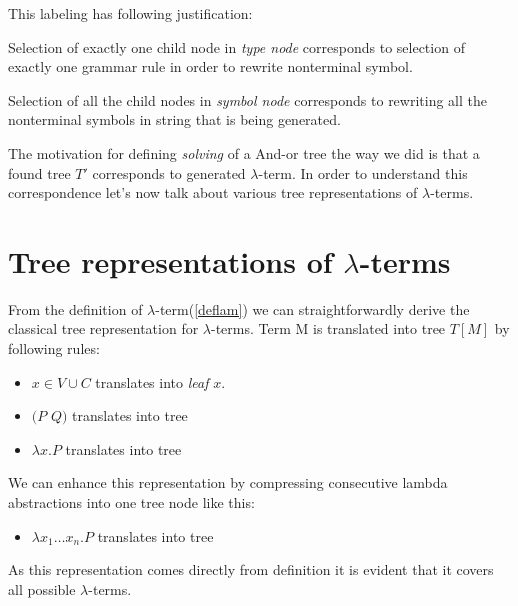 \documentclass[12pt,a4paper]{report}
\newcommand{\lterm}{$\lambda$-term\xspace}
\newcommand{\lterms}{$\lambda$-terms\xspace}
\begin{document}
This labeling has following justification: 

Selection of exactly one
child node in \textit{type node} corresponds to selection of exactly one
grammar rule in order to rewrite nonterminal symbol.  

Selection of all the child nodes in \textit{symbol node} corresponds to 
rewriting all the nonterminal symbols in string that is being generated.  

The motivation for defining \textit{solving} of a And-or tree the way we did is that
a found tree $T'$ corresponds to generated \lterm. 
In order to understand this correspondence let's now talk about various tree representations
of \lterms.

\section{Tree representations of \lterms}
\label{tree-reps}

\newcommand{\sexprTree}{sexpr-tree\xspace}
\newcommand{\atTree}{@-tree\xspace}



From the definition of \lterm (\ref{deflam}) we can straightforwardly derive 
the classical tree representation for \lterms. Term M is translated into tree $T[M]$ by following rules:

\begin{itemize}
	\item $x \in V \cup C$ translates into \textit{leaf} $x$.
	\item $(P$ $Q)$ translates into tree\\
	\item $\lambda x . P$ translates into tree\\
\end{itemize}

We can enhance this representation by compressing consecutive lambda abstractions into one
tree node like this: 

\begin{itemize}
	\item $\lambda x_1 \dots x_n . P$ translates into tree\\
\end{itemize}

As this representation comes directly from definition it is evident 
that it covers all possible \lterms.
\end{document}
